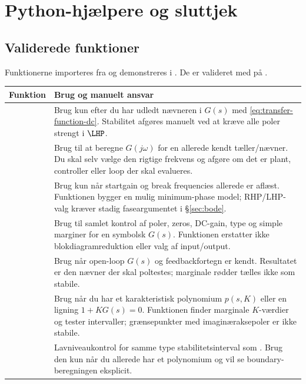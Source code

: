 \section{Python-hjælpere og sluttjek}
\label{sec:python}

\subsection{Validerede funktioner}

Funktionerne importeres fra  og demonstreres i
. De er valideret med
 på .

\begin{tabularx}{\textwidth}{@{}p{}Y@{}}
\toprule
Funktion & Brug og manuelt ansvar \\
\midrule
{} & Brug kun efter du har udledt nævneren i \(G(s)\) med \eqref{eq:transfer-function-dc}. Stabilitet afgøres manuelt ved at kræve alle poler strengt i \(\LHP\).\\
 & Brug til at beregne \(G(j\omega)\) for en allerede kendt tæller/nævner. Du skal selv vælge den rigtige frekvens og afgøre om det er plant, controller eller loop der skal evalueres.\\
 & Brug kun når startgain og break frequencies allerede er aflæst. Funktionen bygger en mulig minimum-phase model; RHP/LHP-valg kræver stadig faseargumentet i \S\ref{sec:bode}.\\
 & Brug til samlet kontrol af poler, zeros, DC-gain, type og simple marginer for en symbolsk \(G(s)\). Funktionen erstatter ikke blokdiagramreduktion eller valg af input/output.\\
 & Brug når open-loop \(G(s)\) og feedbackfortegn er kendt. Resultatet er den nævner der skal poltestes; marginale rødder tælles ikke som stabile.\\
 & Brug når du har et karakteristisk polynomium \(p(s,K)\) eller en ligning \(1+KG(s)=0\). Funktionen finder marginale \(K\)-værdier og tester intervaller; grænsepunkter med imaginæraksepoler er ikke stabile.\\
 & Lavniveaukontrol for samme type stabilitetsinterval som . Brug den kun når du allerede har et polynomium og vil se boundary-beregningen eksplicit.\\

\end{tabularx}
